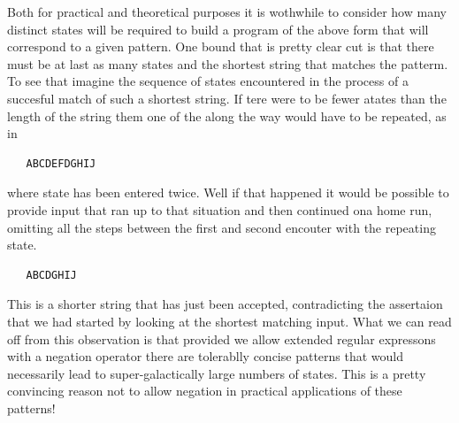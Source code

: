 Both for practical and theoretical purposes it is wothwhile to consider
how many distinct states will be required to build a program of the above
form that will correspond to a given pattern. One bound that is pretty
clear cut is that there must be at last as many states and the shortest
string that matches the patterm. To see that imagine the sequence of
states encountered in the process of a succesful match of such a shortest
string. If tere were to be fewer atates than the length of the string them
one of the along the way would have to be repeated, as in
\begin{verbatim}
   ABCDEFDGHIJ
\end{verbatim}
where state \verb@D@ has been entered twice. Well if that happened it
would be possible to provide input that ran up to that situation and then
continued ona  home run, omitting all the steps between the first and
second encouter with the repeating state.
\begin{verbatim}
   ABCDGHIJ
\end{verbatim}
This is a shorter string that has just been accepted, contradicting the
assertaion that we had started by looking at the shortest matching
input.  What we can read off from this observation is that provided we
allow extended regular expressons with a negation operator there are
tolerablly concise patterns that would necessarily lead to super-galactically
large numbers of states. This is a pretty convincing reason not to allow
negation in practical applications of these patterns!

